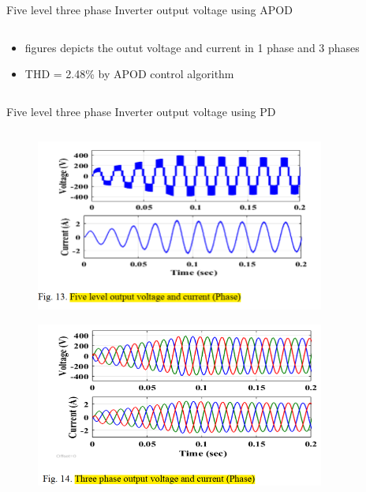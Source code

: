 \documentclass[
	11pt, %
]{beamer}
\begin{document}
\begin{frame}{Five level three phase Inverter output voltage using APOD}
\begin{columns}
\begin{column}{0.5\textwidth}
\begin{figure}
		\end{figure}
		\begin{itemize}
			\scriptsize
			\item {figures depicts the outut voltage and current in 1 phase and 3 phases}
			\item {THD = 2.48\% by APOD control algorithm}
		\end{itemize}
	\end{column}
	\end{columns}
\end{frame}

\begin{frame}{Five level three phase Inverter output voltage using PD}
	\begin{columns}
	\begin{column}{0.5\textwidth}
		\begin{figure}
			\includegraphics[width=0.8\linewidth]{PD_V_C.png}
		\end{figure}
		\begin{figure}
			\includegraphics[width=0.8\linewidth]{PD_V_C_3.png}
		\end{figure}
	\end{column}
	\begin{column}{0.5\textwidth}
		\begin{figure}

\end{figure}
\end{column}
\end{columns}
\end{frame}
\end{document}
